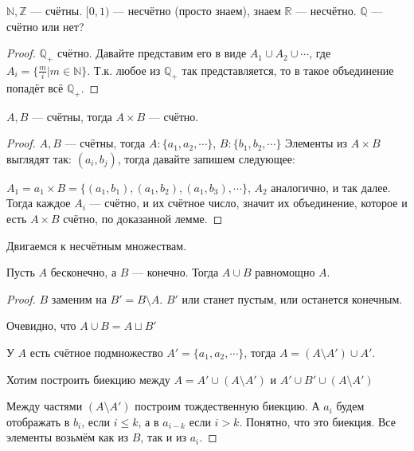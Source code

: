 \begin{exerc}
	$\mathbb{N}, \mathbb{Z}$ --- счётны. $[0, 1)$ --- несчётно (просто знаем), знаем $\mathbb{R}$ --- несчётно. $\mathbb{Q}$ --- счётно или нет?
\end{exerc}

\begin{proof}
	$\mathbb{Q}_+$ счётно. Давайте представим его в виде $A_1 \cup A_2 \cup \cdots$, где $A_i = \{\frac{m}i | m \in \mathbb{N}\}$. Т.к. любое из $\mathbb{Q}_+$ так представляется, то в такое объединение попадёт всё $\mathbb{Q}_+$.
\end{proof}
\begin{lemma}
	$A, B$ --- счётны, тогда $A \times B$ --- счётно.
\end{lemma}
\begin{proof}
	$A, B$ --- счётны, тогда $A: \{a_1, a_2, \cdots\}$, $B: \{b_1, b_2, \cdots\}$
	Элементы из $A \times B$ выглядят так: $(a_i, b_j)$, тогда давайте запишем следующее:

	$A_1 = a_1 \times B = \{(a_1, b_1), (a_1, b_2), (a_1, b_3), \cdots\}$, $A_2$ аналогично, и так далее.
	Тогда каждое $A_i$ --- счётно, и их счётное число, значит их объединение, которое и есть $A \times B$ счётно, по доказанной лемме.
\end{proof}

Двигаемся к несчётным множествам.

\begin{lemma}
Пусть $A$ бесконечно, а $B$ --- конечно. Тогда $A \cup B$ равномощно $A$.
\end{lemma}
\begin{proof}
	$B$ заменим на $B' = B \setminus A$. $B'$ или станет пустым, или останется конечным.

	Очевидно, что $A \cup B = A \sqcup B'$

	У $A$ есть счётное подмножество $A' = \{a_1, a_2, \cdots\}$, тогда $A = (A\setminus A') \cup A'$.

	Хотим построить биекцию между $A = A' \cup (A\setminus A')$ и $A' \cup B' \cup (A\setminus A')$

	Между частями $(A \setminus A')$ построим тождественную биекцию. А $a_i$ будем отображать в $b_i$, если $i \le k$, а в $a_{i-k}$ если $i > k$. Понятно, что это биекция. Все элементы возьмём как из $B$, так и из $a_i$.
\end{proof}


